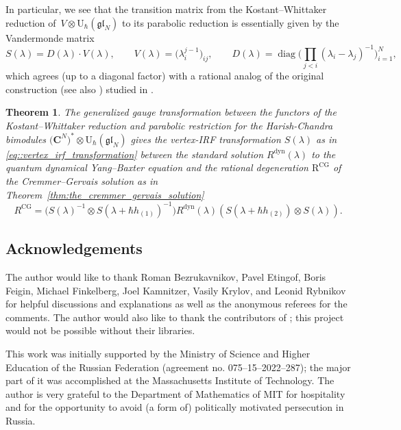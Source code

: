 \documentclass[10pt,a4paper]{article}
\numberwithin{equation}{section}
\newtheorem{Theorem}{Theorem}[section]
\newcommand{\CG}{\mathrm{CG}}
\newcommand{\C}{\mathbf{C}}
\newcommand{\R}{\mathrm{R}}
\newcommand{\U}{\mathrm{U}_{\hbar}}
\newcommand{\dyn}{\mathrm{dyn}}
\newcommand{\gl}{\mathfrak{gl}}
\begin{document}
	In particular, we see that the transition matrix from the Kostant--Whittaker reduction of~$V \otimes \U(\gl_N)$ to its parabolic reduction is essentially given by the Vandermonde matrix
	\begin{equation}
		\label{eq::vertex_irf_transformation}
		S(\lambda) = D(\lambda) \cdot V(\lambda), \qquad V(\lambda) = \bigl(\lambda_i^{j-1}\bigr)_{ij}, \qquad D(\lambda) = \operatorname{diag}\Big(\prod_{j<i} (\lambda_i-\lambda_j)^{-1} \Big)_{i=1}^N,
	\end{equation}
	which agrees (up to a diagonal factor) with a rational analog of the original construction \cite{CremmerGervais} (see also \cite{BuffenoirRocheTerras}) studied in \cite{BalogDabrowskiFeher}.
	
	\begin{Theorem}
		\label{thm:the_vertex_irf_transformation}
		The generalized gauge transformation between the functors of the Kostant--Whittaker reduction and parabolic restriction for the Harish-Chandra bimodules $\bigl(\C^N\bigr)^* \otimes \U(\gl_N)$ gives the vertex-IRF transformation $S(\lambda)$ as in \eqref{eq::vertex_irf_transformation} between the standard solution $R^{\dyn}(\lambda)$ to the quantum dynamical Yang--Baxter equation and the rational degeneration $\R^{\CG}$ of the Cremmer--Gervais solution as in Theorem~{\rm\ref{thm:the_cremmer_gervais_solution}}
		\[
		R^{\CG} = \bigl(S(\lambda)^{-1} \otimes S(\lambda+\hbar h_{(1)})^{-1} \bigr) R^{\dyn}(\lambda) (S(\lambda+\hbar h_{(2)}) \otimes S(\lambda)).
		\]
	\end{Theorem}
	
\subsection*{Acknowledgements} The author would like to thank Roman Bezrukavnikov, Pavel Etingof, Boris Feigin, Michael Finkelberg, Joel Kamnitzer, Vasily Krylov, and Leonid Rybnikov for helpful discussions and explanations as well as the anonymous referees for the comments. The author would also like to thank the contributors of \cite{SageMath}; this project would not be possible without their libraries.
	
This work was initially supported by the Ministry of Science and Higher Education of the Russian Federation (agreement no. 075–15–2022–287); the major part of it was accomplished at the Massachusetts Institute of Technology. The author is very grateful to the Department of Mathematics of MIT for hospitality and for the opportunity to avoid (a form of) politically motivated persecution in Russia.
	
\end{document}
